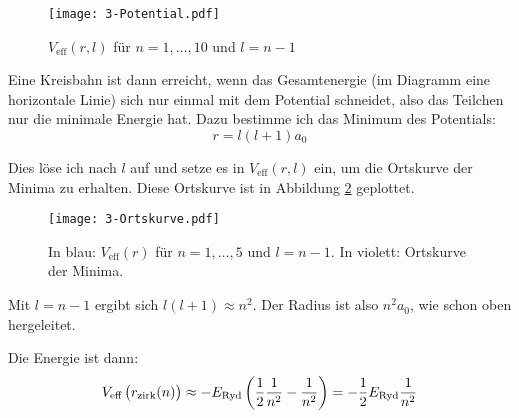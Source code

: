 \begin{figure}
	\centering
	\texttt{[image: 3-Potential.pdf]}
	\caption{$V_\text{eff}(r, l)$ für $n = 1, \ldots, 10$ und $l = n - 1$}
	\label{fig:1}
\end{figure}

Eine Kreisbahn ist dann erreicht, wenn das Gesamtenergie (im Diagramm eine
horizontale Linie) sich nur einmal mit dem Potential schneidet, also das
Teilchen nur die minimale Energie hat. Dazu bestimme ich das Minimum des
Potentials:
\[
	r = l(l+1) a_0
\]

Dies löse ich nach $l$ auf und setze es in $V_\text{eff}(r, l)$ ein, um die
Ortskurve der Minima zu erhalten. Diese Ortskurve ist in Abbildung \ref{fig:2}
geplottet.

\begin{figure}
	\centering
	\texttt{[image: 3-Ortskurve.pdf]}
	\caption{%
		In blau: $V_\text{eff}(r)$ für $n = 1, \ldots, 5$ und $l = n - 1$. In
		violett: Ortskurve der Minima.
	}
	\label{fig:2}
\end{figure}

Mit $l = n - 1$ ergibt sich $l(l+1) \approx n^2$. Der Radius ist also $n^2 a_0$, wie schon oben hergeleitet.

Die Energie ist dann:
\[
	V_\text{eff}\del{r_\text{zirk}(n)}
	\approx - E_\text{Ryd} \del{\half \frac1{n^2} - \frac1{n^2}}
	= - \half E_\text{Ryd} \frac1{n^2}
\]
	

\fehlt


\IfFileExists{\bibliographyfile}{
}{}



